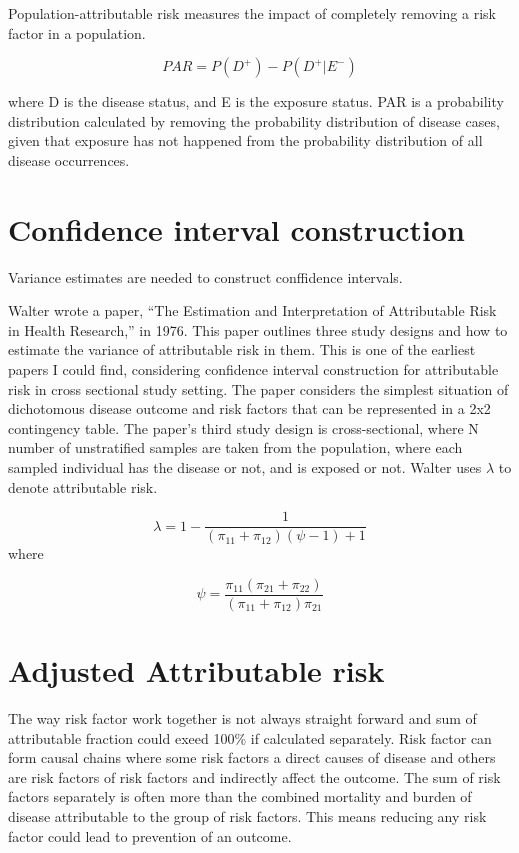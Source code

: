 Population-attributable risk measures the impact of completely removing a risk factor in a population.

\begin{equation} \label{PARequation}
PAR = P(D^+) - P(D^+| E^-)
\end{equation}

where D is the disease status, and E is the exposure status. PAR is a probability distribution calculated by removing the probability distribution of disease cases, given that exposure has not happened from the probability distribution of all disease occurrences. \cite{Pirikahu2016BayesianMO}

\section{Confidence interval construction}\label{FrequentistApproach}
Variance estimates are needed to construct conffidence intervals. \cite{LehnertBatar2006ComparisonOC}

Walter wrote a paper, “The Estimation and Interpretation of Attributable Risk in Health Research,” in 1976. This paper outlines three study designs and how to estimate the variance of attributable risk in them. This is one of the earliest papers I could find, considering confidence interval construction for attributable risk in cross sectional study setting. The paper considers the simplest situation of dichotomous disease outcome and risk factors that can be represented in a 2x2 contingency table. The paper's third study design is cross-sectional, where N number of unstratified samples are taken from the population, where each sampled individual has the disease or not, and is exposed or not. Walter uses $\lambda$ to denote attributable risk.\cite{Walter1976TheEA}

\begin{equation}
    \lambda = 1 - \frac{1}{(\pi_{11} + \pi_{12})(\psi - 1) + 1}
\end{equation}where

\begin{equation}
    \psi = \frac{\pi_{11}(\pi_{21} + \pi_{22})}{(\pi_{11}+\pi_{12})\pi_{21}} 
\end{equation}\cite{Walter1976TheEA}

\section{Adjusted Attributable risk}
The way risk factor work together is not always straight forward and sum of attributable fraction could exeed 100\% if calculated separately. \cite{DiMaso2020AttributableFF} Risk factor can form causal chains where some risk factors a direct causes of disease and others are risk factors of risk factors and indirectly affect the outcome. The sum of risk factors separately is often more than the combined mortality and burden of disease attributable to the group of risk factors. This means reducing any risk factor could lead to prevention of an outcome.\cite{WHO2009GlobalHealthRisks}

